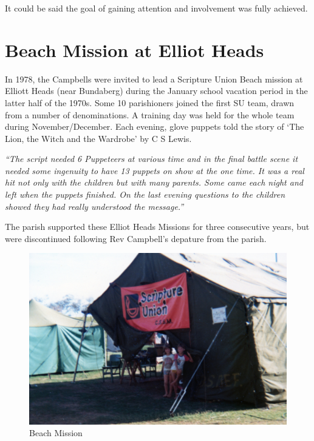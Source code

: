 \smallskip


It could be said the goal of gaining attention and involvement was fully achieved.



\section{Beach Mission at Elliot Heads}



In 1978, the Campbells were invited to lead a Scripture Union Beach mission at Elliott Heads (near Bundaberg) during the January school vacation period in the latter half of the 1970s. Some 10 parishioners joined the first SU team, drawn from a number of denominations. A training day was held for the whole team during November/December. Each evening, glove puppets told the story of `The Lion, the Witch and the Wardrobe' by C S Lewis.



\emph{``The script needed 6 Puppeteers at various time and in the final battle scene it needed some ingenuity to have 13 puppets on show at the one time. It was a real hit not only with the children but with many parents. Some came each night and left when the puppets finished. On the last evening questions to the children showed they had really understood the message.''}



The parish supported these Elliot Heads Missions for three consecutive years, but were discontinued following Rev Campbell's depature from the parish.









\begin{figure}[!htb]
\begin{center}
\includegraphics[width=1.\textwidth,center]{../images/beachMission1980.jpg}
\caption{Beach Mission}
\end{center}
\end{figure}




